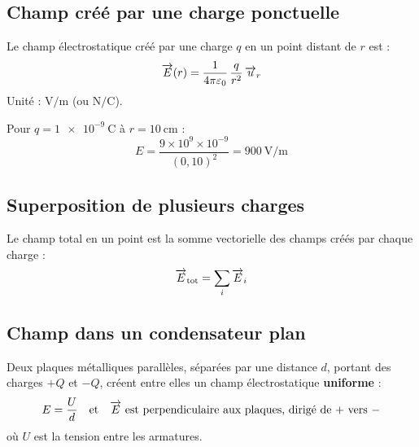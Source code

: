 \subsection{Champ créé par une charge ponctuelle}

\begin{definition}
Le champ électrostatique créé par une charge $q$ en un point distant de $r$ est :
\[
\overrightarrow{E}(r) = \frac{1}{4\pi\varepsilon_0}\,\frac{q}{r^2}\,\overrightarrow{u}_r
\]
Unité : $\si{\volt\per\metre}$ (ou $\si{\newton\per\coulomb}$).
\end{definition}

\begin{exemple}
Pour $q = \SI{1e-9}{\coulomb}$ à $r = \SI{10}{\centi\metre}$ :
\[
E = \frac{9\times10^9 \times 10^{-9}}{(0,10)^2} = \SI{900}{\volt\per\metre}
\]
\end{exemple}

\subsection{Superposition de plusieurs charges}

\begin{propriete}
Le champ total en un point est la somme vectorielle des champs créés par chaque charge :
\[
\overrightarrow{E}_{\text{tot}} = \sum_i \overrightarrow{E}_i
\]
\end{propriete}

\begin{illus}
\end{illus}

\subsection{Champ dans un condensateur plan}

\begin{definition}
Deux plaques métalliques parallèles, séparées par une distance $d$, portant des charges $+Q$ et $-Q$, créent entre elles un champ électrostatique \textbf{uniforme} :
\[
E = \frac{U}{d} \quad\text{et}\quad \overrightarrow{E} \text{ est perpendiculaire aux plaques, dirigé de $+$ vers $-$}
\]
où $U$ est la tension entre les armatures.
\end{definition}

